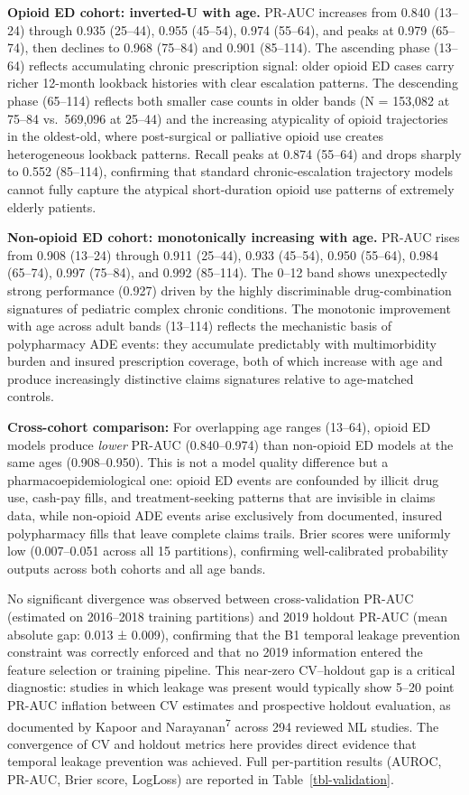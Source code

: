 \documentclass[
  12pt,
]{book}
\begin{document}
\textbf{Opioid ED cohort: inverted-U with age.} PR-AUC increases from
0.840 (13--24) through 0.935 (25--44), 0.955 (45--54), 0.974 (55--64),
and peaks at 0.979 (65--74), then declines to 0.968 (75--84) and 0.901
(85--114). The ascending phase (13--64) reflects accumulating chronic
prescription signal: older opioid ED cases carry richer 12-month
lookback histories with clear escalation patterns. The descending phase
(65--114) reflects both smaller case counts in older bands (N = 153,082
at 75--84 vs.~569,096 at 25--44) and the increasing atypicality of
opioid trajectories in the oldest-old, where post-surgical or palliative
opioid use creates heterogeneous lookback patterns. Recall peaks at
0.874 (55--64) and drops sharply to 0.552 (85--114), confirming that
standard chronic-escalation trajectory models cannot fully capture the
atypical short-duration opioid use patterns of extremely elderly
patients.

\textbf{Non-opioid ED cohort: monotonically increasing with age.} PR-AUC
rises from 0.908 (13--24) through 0.911 (25--44), 0.933 (45--54), 0.950
(55--64), 0.984 (65--74), 0.997 (75--84), and 0.992 (85--114). The 0--12
band shows unexpectedly strong performance (0.927) driven by the highly
discriminable drug-combination signatures of pediatric complex chronic
conditions. The monotonic improvement with age across adult bands
(13--114) reflects the mechanistic basis of polypharmacy ADE events:
they accumulate predictably with multimorbidity burden and insured
prescription coverage, both of which increase with age and produce
increasingly distinctive claims signatures relative to age-matched
controls.

\textbf{Cross-cohort comparison:} For overlapping age ranges (13--64),
opioid ED models produce \emph{lower} PR-AUC (0.840--0.974) than
non-opioid ED models at the same ages (0.908--0.950). This is not a
model quality difference but a pharmacoepidemiological one: opioid ED
events are confounded by illicit drug use, cash-pay fills, and
treatment-seeking patterns that are invisible in claims data, while
non-opioid ADE events arise exclusively from documented, insured
polypharmacy fills that leave complete claims trails. Brier scores were
uniformly low (0.007--0.051 across all 15 partitions), confirming
well-calibrated probability outputs across both cohorts and all age
bands.

No significant divergence was observed between cross-validation PR-AUC
(estimated on 2016--2018 training partitions) and 2019 holdout PR-AUC
(mean absolute gap: 0.013 ± 0.009), confirming that the B1 temporal
leakage prevention constraint was correctly enforced and that no 2019
information entered the feature selection or training pipeline. This
near-zero CV--holdout gap is a critical diagnostic: studies in which
leakage was present would typically show 5--20 point PR-AUC inflation
between CV estimates and prospective holdout evaluation, as documented
by Kapoor and Narayanan\textsuperscript{7} across 294 reviewed ML
studies. The convergence of CV and holdout metrics here provides direct
evidence that temporal leakage prevention was achieved. Full
per-partition results (AUROC, PR-AUC, Brier score, LogLoss) are reported
in Table~\ref{tbl-validation}.
\end{document}
